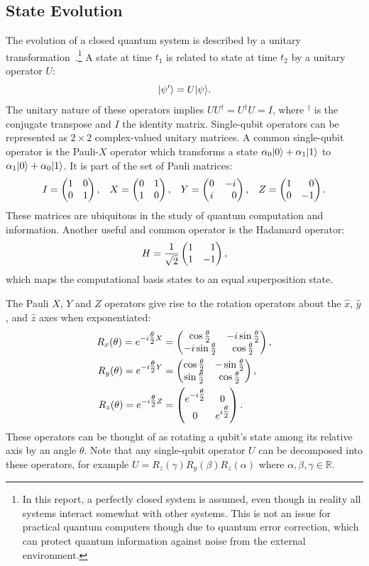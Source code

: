 \subsection{State Evolution} \label{sec:state-evolution}
The evolution of a closed quantum system is described by a unitary transformation~\cite[Section 2.2]{nielsen2002quantum}.\footnote{In this report, a perfectly closed system is assumed, even though in reality all systems interact somewhat with other systems. This is not an issue for practical quantum computers though due to quantum error correction, which can protect quantum information against noise from the external environment.}
A state \ket{\psi} at time $t_1$ is related to state  at time $t_2$ by a unitary operator $U$:
\begin{equation}
\vert{\psi'}\rangle = U\vert{\psi}\rangle.
\end{equation}
The unitary nature of these operators implies $UU^\dagger = U^\dagger U = I$, where $^\dagger$ is the conjugate transpose and $I$ the identity matrix.
Single-qubit operators can be represented as $2 \times 2$ complex-valued unitary matrices.
A common single-qubit operator is the Pauli-$X$ operator which transforms a state $\alpha_0\vert{0}\rangle + \alpha_1\vert{1}\rangle$ to $\alpha_1\vert{0}\rangle + \alpha_0\vert{1}\rangle$.
It is part of the set of Pauli matrices:
\begin{equation}
I = \igate{}, \hspace*{3mm}
X = \xgate{}, \hspace*{3mm}
Y = \ygate{}, \hspace*{3mm}
Z = \zgate{}.
\end{equation}
These matrices are ubiquitous in the study of quantum computation and information.
Another useful and common operator is the Hadamard operator:
\begin{equation}
H = \hgate{},
\end{equation}
which maps the computational basis states to an equal superposition state.

The Pauli $X$, $Y$ and $Z$ operators give rise to the rotation operators about the $\hat{x}$, $\hat{y}$, and $\hat{z}$ axes when exponentiated:
\begin{align}
R_x(\theta) = e^{-i\tfrac{\theta}{2} X} &= \begin{pmatrix} \cos\tfrac{\theta}{2} & -i\sin\tfrac{\theta}{2} \\ -i\sin\tfrac{\theta}{2} & \cos\tfrac{\theta}{2} \end{pmatrix}{}, \\
R_y(\theta) = e^{-i\tfrac{\theta}{2} Y} &= \begin{pmatrix} \cos\tfrac{\theta}{2} & -\sin\tfrac{\theta}{2} \\ \sin\tfrac{\theta}{2} & \cos\tfrac{\theta}{2} \end{pmatrix}{}, \\
R_z(\theta) = e^{-i\tfrac{\theta}{2} Z} &= \begin{pmatrix} e^{-i\tfrac{\theta}{2}} & 0 \\ 0 & e^{i\tfrac{\theta}{2}} \end{pmatrix}{}.
\end{align}
These operators can be thought of as rotating a qubit's state among its relative axis by an angle $\theta$.
Note that any single-qubit operator $U$ can be decomposed into these operators, for example $U = R_z(\gamma)R_y(\beta)R_z(\alpha)$ where $\alpha, \beta, \gamma \in \mathbb{R}$.

